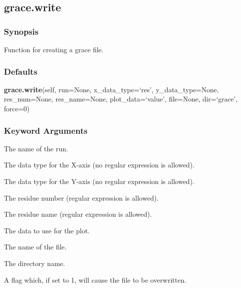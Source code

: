 



\newpage

\subsection{grace.write}


\subsubsection{Synopsis}

Function for creating a grace  file.



\subsubsection{Defaults}

\textsf{\textbf{grace.write}(self, run=None, x\_data\_type=`res', y\_data\_type=None, res\_num=None, res\_name=None, plot\_data=`value', file=None, dir=`grace', force=0)}


\subsubsection{Keyword Arguments}

  The name of the run. 

  The data type for the X-axis (no regular expression is allowed). 

  The data type for the Y-axis (no regular expression is allowed). 

  The residue number (regular expression is allowed). 

  The residue name (regular expression is allowed). 

  The data to use for the plot. 

  The name of the file. 

  The directory name. 

  A flag which, if set to 1, will cause the file to be overwritten. 




